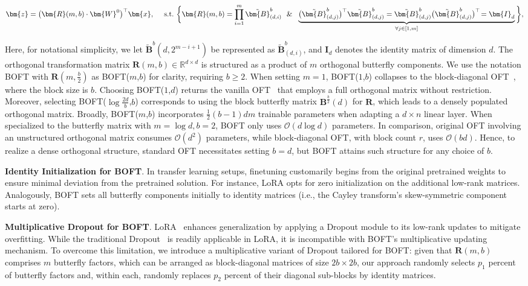\begin{equation}
    \begin{aligned}\nonumber
    \bm{z}=\big(\bm{R}(m,b)\cdot\bm{W}^0\big)^\top\bm{x},~~~~\text{s.t.}~\bigg{\{}\bm{R}(m,b)=\prod_{i=1}^m \tilde{\bm{B}}^b_{(d,i)}~~\&~~\underbrace{\big(\tilde{\bm{B}}^b_{(d,j)}\big)^\top\tilde{\bm{B}}^b_{(d,j)}=\tilde{\bm{B}}^b_{(d,j)}\big(\tilde{\bm{B}}^b_{(d,j)}\big)^\top\!=\bm{I}_d}_{\forall j\in [1, m]}\bigg{\}},
    \end{aligned}
\end{equation}

Here, for notational simplicity, we let $\tilde{\bm{B}}^b(d,2^{m - i+1})$ be represented as $\tilde{\bm{B}}^b_{(d,i)}$, and $\bm{I}_d$ denotes the identity matrix of dimension $d$. The orthogonal transformation matrix $\bm{R}(m,b)\in\mathbb{R}^{d\times d}$ is structured as a product of $m$ orthogonal butterfly components. We use the notation BOFT with $\bm{R}(m,\frac{b}{2})$ as BOFT($m$,$b$) for clarity, requiring $b\geq 2$. When setting $m=1$, BOFT($1$,$b$) collapses to the block-diagonal OFT~\cite{qiu2023controlling}, where the block size is $b$. Choosing BOFT($1$,$d$) returns the vanilla OFT~\cite{qiu2023controlling} that employs a full orthogonal matrix without restriction. Moreover, selecting BOFT($\log \frac{2d}{b}$,$b$) corresponds to using the block butterfly matrix $\bm{B}^{\frac{b}{2}}(d)$ for $\bm{R}$, which leads to a densely populated orthogonal matrix. Broadly, BOFT($m$,$b$) incorporates $\frac{1}{2}(b-1)dm$ trainable parameters when adapting a $d\times n$ linear layer. When specialized to the butterfly matrix with $m=\log d, b=2$, BOFT only uses $\mathcal{O}(d\log d)$ parameters. In comparison, original OFT involving an unstructured orthogonal matrix consumes $\mathcal{O}(d^2)$ parameters, while block-diagonal OFT, with block count $r$, uses $\mathcal{O}(bd)$. Hence, to realize a dense orthogonal structure, standard OFT necessitates setting $b=d$, but BOFT attains such structure for any choice of $b$.

\textbf{Identity Initialization for BOFT}. In transfer learning setups, finetuning customarily begins from the original pretrained weights to ensure minimal deviation from the pretrained solution. For instance, LoRA opts for zero initialization on the additional low-rank matrices. Analogously, BOFT sets all butterfly components initially to identity matrices (i.e., the Cayley transform’s skew-symmetric component starts at zero).

\textbf{Multiplicative Dropout for BOFT}. LoRA~\cite{hulora2022} enhances generalization by applying a Dropout module to its low-rank updates to mitigate overfitting. While the traditional Dropout~\cite{srivastava2014dropout} is readily applicable in LoRA, it is incompatible with BOFT’s multiplicative updating mechanism. To overcome this limitation, we introduce a multiplicative variant of Dropout tailored for BOFT: given that $\bm{R}(m,b)$ comprises $m$ butterfly factors, which can be arranged as block-diagonal matrices of size $2b\times 2b$, our approach randomly selects $p_1$ percent of butterfly factors and, within each, randomly replaces $p_2$ percent of their diagonal sub-blocks by identity matrices.

